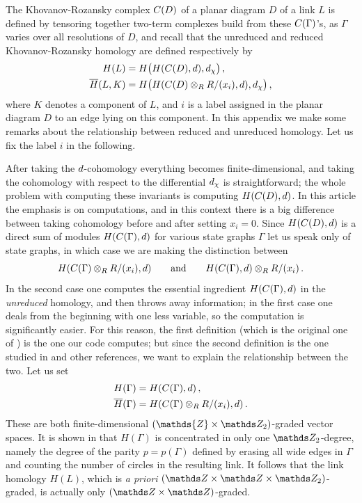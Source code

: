 \documentclass{compositio}
\theoremstyle{definition}
\numberwithin{equation}{section}
\begin{document}
The Khovanov-Rozansky complex $C(D)$ of a planar diagram $D$ of a link $L$ is defined by tensoring together two-term complexes build from these $C(\Gamma)$'s, as $\Gamma$ varies over all resolutions of $D$, and recall that the unreduced and reduced Khovanov-Rozansky homology are defined respectively by
\begin{align*}
H(L) &= H\big( H(C(D),d), d_{\chi} \big) \, ,\\
\overline{H}(L, K) &= H\big( H( C(D) \otimes_{R} R/(x_i), d), d_{\chi} \big) \, ,
\end{align*}
where $K$ denotes a component of $L$, and $i$ is a label assigned in the planar diagram $D$ to an edge lying on this component. In this appendix we make some remarks about the relationship between reduced and unreduced homology. Let us fix the label $i$ in the following.

After taking the $d$-cohomology everything becomes finite-dimensional, and taking the cohomology with respect to the differential $d_{\chi}$ is straightforward; the whole problem with computing these invariants is computing $H(C(D), d)$. In this article the emphasis is on computations, and in this context there is a big difference between taking cohomology before and after setting $x_i = 0$. Since $H(C(D), d)$ is a direct sum of modules $H(C(\Gamma), d)$ for various state graphs $\Gamma$ let us speak only of state graphs, in which case we are making the distinction between
\[
H(C(\Gamma) \otimes_R R/(x_i), d ) \qquad \text{and} \qquad H( C(\Gamma), d ) \otimes_R R/(x_i) \, .
\]
In the second case one computes the essential ingredient $H( C(\Gamma), d )$ in the \emph{unreduced} homology, and then throws away information; in the first case one deals from the beginning with one less variable, so the computation is significantly easier. For this reason, the first definition (which is the original one of \cite{kr0401268}) is the one our code computes; but since the second definition is the one studied in \cite{r0607544} and other references, we want to explain the relationship between the two. Let us set
\begin{align*}
H(\Gamma) &= H( C(\Gamma), d ) \, ,\\
\overline{H}(\Gamma) &= H( C(\Gamma) \otimes_R R/(x_i), d ) \, .
\end{align*}
These are both finite-dimensional $(\mathds{Z} \times \Ztwo)$-graded vector spaces. It is shown in \cite{kr0401268} that $H(\Gamma)$ is concentrated in only one $\Ztwo$-degree, namely the degree of the parity $p = p(\Gamma)$ defined by erasing all wide edges in $\Gamma$ and counting the number of circles in the resulting link. It follows that the link homology $H(L)$, which is \emph{a priori} $(\ZZ \times \ZZ \times \Ztwo)$-graded, is actually only $(\ZZ \times \ZZ)$-graded.
\end{document}
